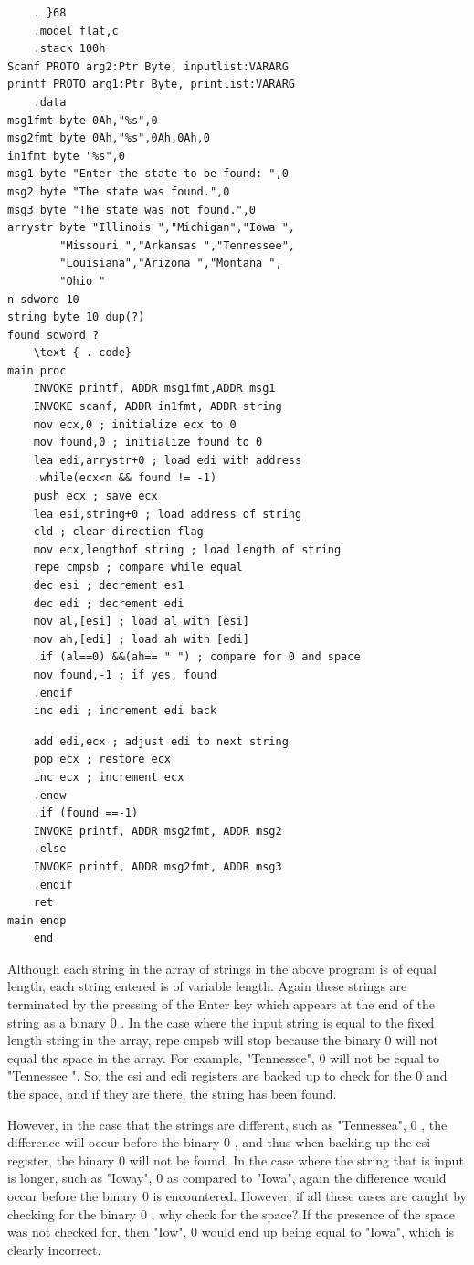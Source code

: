 \documentclass[10pt]{book}
\begin{document}
\begin{verbatim}
    . }68
    .model flat,c
    .stack 100h
Scanf PROTO arg2:Ptr Byte, inputlist:VARARG
printf PROTO arg1:Ptr Byte, printlist:VARARG
    .data
msg1fmt byte 0Ah,"%s",0
msg2fmt byte 0Ah,"%s",0Ah,0Ah,0
in1fmt byte "%s",0
msg1 byte "Enter the state to be found: ",0
msg2 byte "The state was found.",0
msg3 byte "The state was not found.",0
arrystr byte "Illinois ","Michigan","Iowa ",
        "Missouri ","Arkansas ","Tennessee",
        "Louisiana","Arizona ","Montana ",
        "Ohio "
n sdword 10
string byte 10 dup(?)
found sdword ?
    \text { . code}
main proc
    INVOKE printf, ADDR msg1fmt,ADDR msg1
    INVOKE scanf, ADDR in1fmt, ADDR string
    mov ecx,0 ; initialize ecx to 0
    mov found,0 ; initialize found to 0
    lea edi,arrystr+0 ; load edi with address
    .while(ecx<n && found != -1)
    push ecx ; save ecx
    lea esi,string+0 ; load address of string
    cld ; clear direction flag
    mov ecx,lengthof string ; load length of string
    repe cmpsb ; compare while equal
    dec esi ; decrement es1
    dec edi ; decrement edi
    mov al,[esi] ; load al with [esi]
    mov ah,[edi] ; load ah with [edi]
    .if (al==0) &&(ah== " ") ; compare for 0 and space
    mov found,-1 ; if yes, found
    .endif
    inc edi ; increment edi back
\end{verbatim}

\begin{verbatim}
    add edi,ecx ; adjust edi to next string
    pop ecx ; restore ecx
    inc ecx ; increment ecx
    .endw
    .if (found ==-1)
    INVOKE printf, ADDR msg2fmt, ADDR msg2
    .else
    INVOKE printf, ADDR msg2fmt, ADDR msg3
    .endif
    ret
main endp
    end
\end{verbatim}

Although each string in the array of strings in the above program is of equal length, each string entered is of variable length. Again these strings are terminated by the pressing of the Enter key which appears at the end of the string as a binary 0 . In the case where the input string is equal to the fixed length string in the array, repe cmpsb will stop because the binary 0 will not equal the space in the array. For example, "Tennessee", 0 will not be equal to "Tennessee ". So, the esi and edi registers are backed up to check for the 0 and the space, and if they are there, the string has been found.

However, in the case that the strings are different, such as "Tennessea", 0 , the difference will occur before the binary 0 , and thus when backing up the esi register, the binary 0 will not be found. In the case where the string that is input is longer, such as "Ioway", 0 as compared to "Iowa", again the difference would occur before the binary 0 is encountered. However, if all these cases are caught by checking for the binary 0 , why check for the space? If the presence of the space was not checked for, then "Iow", 0 would end up being equal to "Iowa", which is clearly incorrect.
\end{document}
